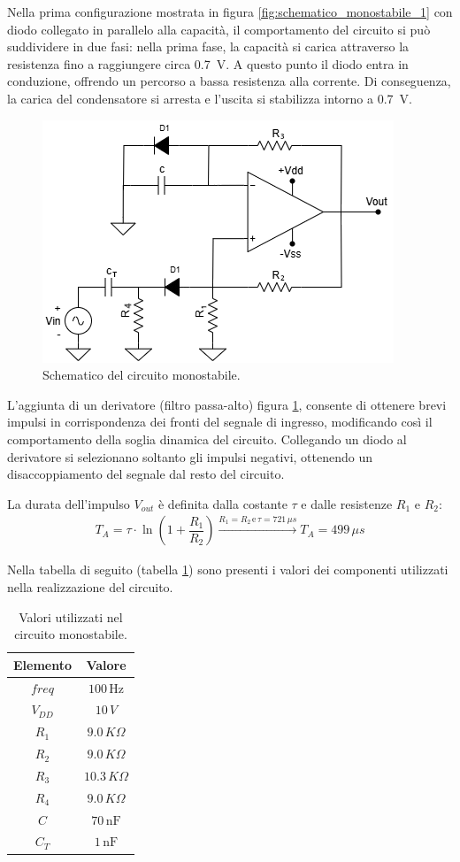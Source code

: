 \documentclass[a4paper,12pt]{article}
\begin{document}
Nella prima configurazione mostrata in figura \ref{fig:schematico_monostabile_1} con diodo collegato in parallelo alla capacità, il comportamento del circuito si può suddividere in due fasi: nella prima fase, la capacità si carica attraverso la resistenza fino a raggiungere circa \SI{0.7}{\volt}.
A questo punto il diodo entra in conduzione, offrendo un percorso a bassa resistenza alla corrente.
Di conseguenza, la carica del condensatore si arresta e l’uscita si stabilizza intorno a \SI{0.7}{\volt}.

\begin{figure}[h]
	\centering
	\includegraphics[width=0.5\linewidth]{immagini/monostabile/circuito.png}
	\caption{Schematico del circuito monostabile.}
	\label{fig:schematico_monostabile}
\end{figure}


L’aggiunta di un derivatore (filtro passa-alto) figura \ref{fig:schematico_monostabile}, consente di ottenere brevi impulsi in corrispondenza dei fronti del segnale di ingresso, modificando così il comportamento della soglia dinamica del circuito.
Collegando un diodo al derivatore si selezionano soltanto gli impulsi negativi, ottenendo un disaccoppiamento del segnale dal resto del circuito.

La durata dell'impulso $V_{out}$ è definita dalla costante $\tau$ e dalle resistenze $R_{1}$ e $R_{2}$:
\begin{align*}
	T_{A}=\tau\cdot\ln(1+\dfrac{R_{1}}{R_{2}}) \xrightarrow{R_1 = R_2 \,\text{e}\, \tau = 721\,\mu s } T_A = 499\,\mu s
\end{align*}

Nella tabella di seguito (tabella \ref{tab:monostabile}) sono presenti i valori dei componenti utilizzati nella realizzazione del circuito.
\begin{table}[h]
	\centering
	\setlength{\tabcolsep}{20pt}
	\begin{tabular}{c c}
		\toprule
		Elemento & Valore             \\
		\midrule
		$freq$   & $100\,\mathrm{Hz}$ \\
		$V_{DD}$ & $10\,V$            \\
		$R_1$    & $9.0\,K\Omega$     \\
		$R_2$    & $9.0\,K\Omega$     \\
		$R_3$    & $10.3\,K\Omega$    \\
		$R_4$    & $9.0\,K\Omega$     \\
		$C$      & $70\,\mathrm{nF}$  \\
		$C_T$    & $1\,\mathrm{nF}$   \\
		\bottomrule
	\end{tabular}
	\caption{Valori utilizzati nel circuito monostabile.}
	\label{tab:monostabile}
\end{table}
\end{document}
